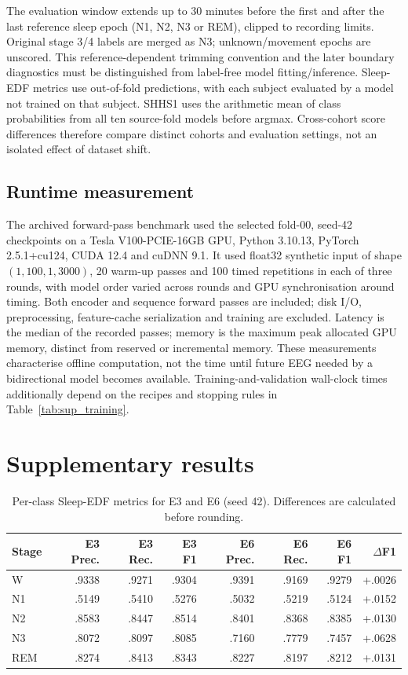 \documentclass[10pt,a4paper]{article}
\begin{document}
The evaluation window extends up to 30 minutes before the first and after the last reference
sleep epoch (N1, N2, N3 or REM), clipped to recording limits. Original stage 3/4 labels are merged
as N3; unknown/movement epochs are unscored. This reference-dependent trimming convention and
the later boundary diagnostics must be distinguished from label-free model fitting/inference.
Sleep-EDF metrics use out-of-fold predictions, with each subject evaluated by a model not trained
on that subject. SHHS1 uses the arithmetic mean of class probabilities from all ten source-fold
models before argmax. Cross-cohort score differences therefore compare distinct cohorts and
evaluation settings, not an isolated effect of dataset shift.

\subsection*{Runtime measurement}

The archived forward-pass benchmark used the selected fold-00, seed-42 checkpoints on a Tesla
V100-PCIE-16GB GPU, Python 3.10.13, PyTorch 2.5.1+cu124, CUDA 12.4 and cuDNN 9.1. It used float32
synthetic input of shape $(1,100,1,3000)$, 20 warm-up passes and 100 timed repetitions in each of
three rounds, with model order varied across rounds and GPU synchronisation around timing.
Both encoder and sequence forward passes are included; disk I/O, preprocessing, feature-cache
serialization and training are excluded. Latency is the median of the recorded passes; memory
is the maximum peak allocated GPU memory, distinct from reserved or incremental memory. These
measurements characterise offline computation, not the time until future EEG needed by a
bidirectional model becomes available. Training-and-validation wall-clock times additionally
depend on the recipes and stopping rules in Table~\ref{tab:sup_training}.

\section*{Supplementary results}

\begin{table}[H]
\centering\small
\caption{Per-class Sleep-EDF metrics for E3 and E6 (seed 42). Differences are calculated before rounding.}
\label{tab:sup_edf_perclass}
\begin{tabular}{lrrrrrrr}
\toprule
Stage & E3 Prec. & E3 Rec. & E3 F1 & E6 Prec. & E6 Rec. & E6 F1 & $\Delta$F1 \\
\midrule
W & .9338 & .9271 & .9304 & .9391 & .9169 & .9279 & +.0026 \\
N1 & .5149 & .5410 & .5276 & .5032 & .5219 & .5124 & +.0152 \\
N2 & .8583 & .8447 & .8514 & .8401 & .8368 & .8385 & +.0130 \\
N3 & .8072 & .8097 & .8085 & .7160 & .7779 & .7457 & +.0628 \\
REM & .8274 & .8413 & .8343 & .8227 & .8197 & .8212 & +.0131 \\
\bottomrule
\end{tabular}
\end{table}
\end{document}
